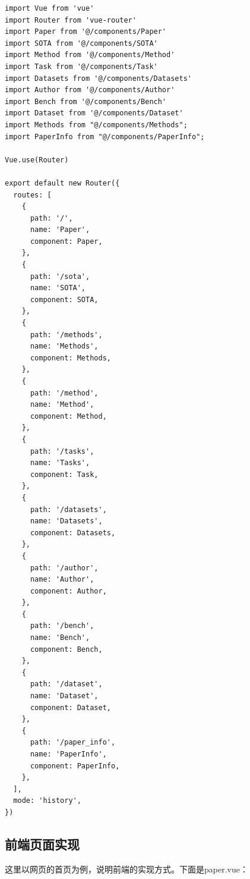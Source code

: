 \scriptsize
\begin{verbatim}
import Vue from 'vue'
import Router from 'vue-router'
import Paper from '@/components/Paper'
import SOTA from '@/components/SOTA'
import Method from '@/components/Method'
import Task from '@/components/Task'
import Datasets from '@/components/Datasets'
import Author from '@/components/Author'
import Bench from '@/components/Bench'
import Dataset from '@/components/Dataset'
import Methods from "@/components/Methods";
import PaperInfo from "@/components/PaperInfo";

Vue.use(Router)

export default new Router({
  routes: [
    {
      path: '/',
      name: 'Paper',
      component: Paper,
    },
    {
      path: '/sota',
      name: 'SOTA',
      component: SOTA,
    },
    {
      path: '/methods',
      name: 'Methods',
      component: Methods,
    },
    {
      path: '/method',
      name: 'Method',
      component: Method,
    },
    {
      path: '/tasks',
      name: 'Tasks',
      component: Task,
    },
    {
      path: '/datasets',
      name: 'Datasets',
      component: Datasets,
    },
    {
      path: '/author',
      name: 'Author',
      component: Author,
    },
    {
      path: '/bench',
      name: 'Bench',
      component: Bench,
    },
    {
      path: '/dataset',
      name: 'Dataset',
      component: Dataset,
    },
    {
      path: '/paper_info',
      name: 'PaperInfo',
      component: PaperInfo,
    },
  ],
  mode: 'history',
})
\end{verbatim}
\normalsize

\subsection{前端页面实现}

这里以网页的首页为例，说明前端的实现方式。下面是paper.vue：

